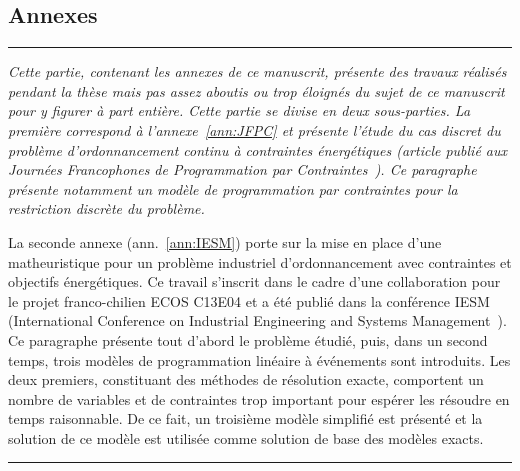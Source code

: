 \cleardoublepage
{}
\begin{center}
  \begin{minipage}{\textwidth}
  \part*{Annexes}
\end{minipage}
\end{center}

\newpage
\thispagestyle{empty}
\begin{center}
  \begin{minipage}{\textwidth}
    \hrule
    \vspace{0.5cm}
    {\it  Cette partie, contenant les annexes de ce manuscrit, présente des
      travaux réalisés pendant la thèse mais pas assez aboutis ou trop
      éloignés du sujet de ce manuscrit pour y figurer à part
      entière. Cette partie se divise en deux sous-parties. La
      première correspond à l'annexe~\ref{ann:JFPC} et
      présente l'étude du cas discret du problème d'ordonnancement
      continu à contraintes énergétiques (article publié aux
      Journées Francophones de Programmation par
      Contraintes~\cite{Nattaf_JFPC}). Ce paragraphe présente
      notamment un modèle de programmation par contraintes pour la
      restriction discrète du problème.

      La seconde annexe (ann.~\ref{ann:IESM}) porte sur la mise en place d'une
      matheuristique pour un problème industriel d'ordonnancement avec
      contraintes et objectifs énergétiques. Ce travail s'inscrit dans
      le cadre d'une collaboration pour le projet franco-chilien ECOS C13E04 et a
      été publié dans la conférence IESM (International Conference on
      Industrial Engineering and Systems
      Management~\cite{Nattaf_IESM}). Ce paragraphe présente tout
      d'abord le problème étudié, puis, dans un second temps, trois
      modèles de programmation linéaire à événements sont introduits. Les deux
      premiers, constituant des méthodes de résolution exacte,
      comportent un nombre de variables et de contraintes trop
      important pour espérer les résoudre en temps raisonnable. De ce
      fait, un troisième modèle simplifié est présenté et la solution
      de ce modèle est utilisée comme solution de base des modèles
      exacts.}   
    \vspace{0.5cm}
    \hrule
  \end{minipage}
\end{center}


